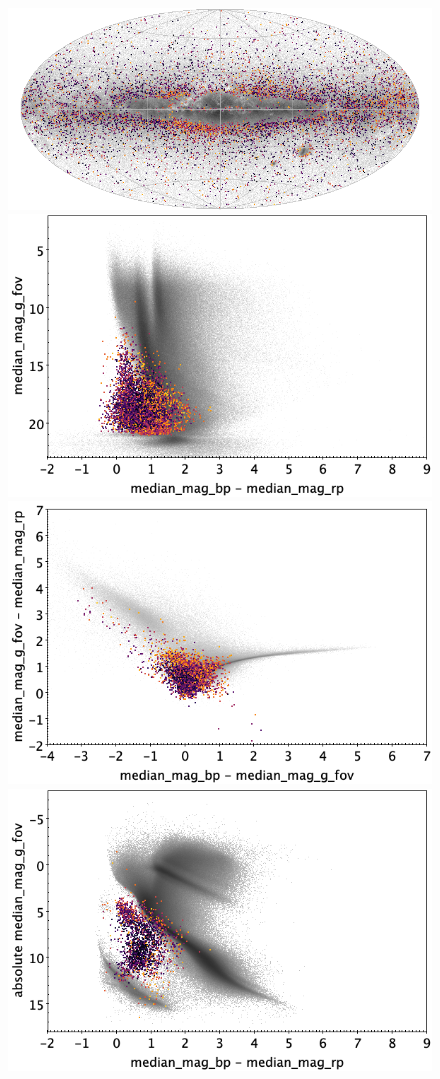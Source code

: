 \documentclass[longauth]{aa}
\begin{document}
\begin{appendix}
\begin{figure}
\centering
{}
\includegraphics[width=0.6\hsize]{figures/appendix/CV_cls_sky.png} 
 \\ %
\vspace{4mm}
 \includegraphics[width=0.45\hsize]{figures/appendix/CV_cls_cm.png}  %
\hspace{2mm}
 \includegraphics[width=0.45\hsize]{figures/appendix/CV_cls_cc.png} \\ %
\vspace{4mm}
 \includegraphics[width=0.45\hsize]{figures/appendix/CV_cls_cam.png}  %

\end{figure}
\end{appendix}
\end{document}

